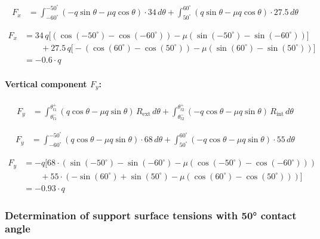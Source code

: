 \documentclass[12pt]{article}
\begin{document}
\begin{align*}
F_x &=
\int_{-60^\circ}^{-50^\circ} (-q \sin\theta - \mu q \cos\theta) \cdot 34 \, d\theta
+
\int_{50^\circ}^{60^\circ} (q \sin\theta - \mu q \cos\theta) \cdot 27.5 \, d\theta
\end{align*}

\begin{equation}
\begin{aligned}
F_x &= 34 \,q \Big[
    (\cos(-50^\circ) - \cos(-60^\circ) )
    - \mu \left( \sin(-50^\circ) - \sin(-60^\circ) \right)\Big] \\
&\qquad + 
27.5 \, q \Big[ 
    -(\cos(60^\circ) - \cos(50^\circ) )
    - \mu \left( \sin(60^\circ) - \sin(50^\circ) \right)
\Big] \\
&= \boxed{-0.6 \cdot q}
\end{aligned}
\tag{2.26}
\end{equation}

\paragraph{Vertical component \( F_y \):}
\begin{align}
F_y &=
\int_{\theta_{t1}^-}^{\theta_{t1}^+} (q \cos\theta - \mu q \sin\theta) \, R_{\text{ext}} \, d\theta
+
\int_{\theta_{t2}^-}^{\theta_{t2}^+} (-q \cos\theta - \mu q \sin\theta) \, R_{\text{int}} \, d\theta
\tag{2.27}
\end{align}

\begin{align*}
F_y &=
\int_{-60^\circ}^{-50^\circ} (q \cos\theta - \mu q \sin\theta) \cdot 68 \, d\theta
+
\int_{50^\circ}^{60^\circ} (-q \cos\theta - \mu q \sin\theta) \cdot 55 \, d\theta
\end{align*}

\begin{equation}
\begin{aligned}
F_y &= -q \Big[
68 \cdot \left( 
    \sin(-50^\circ) - \sin(-60^\circ)
    - \mu \left( \cos(-50^\circ) - \cos(-60^\circ) \right)
\right) \\
&\qquad + 
55 \cdot \left( 
    -\sin(60^\circ) + \sin(50^\circ)
    - \mu \left( \cos(60^\circ) - \cos(50^\circ) \right)
\right)
\Big] \\
&= \boxed{-0.93 \cdot q}
\end{aligned}
\tag{2.28}
\end{equation}

\subsubsection{Determination of support surface tensions with 50° contact angle}
\end{document}
